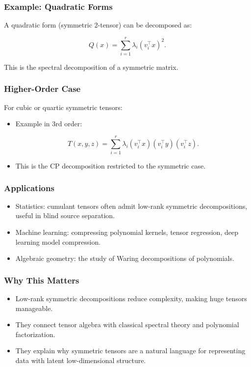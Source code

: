 \documentclass[
  letterpaper,
  DIV=11,
  numbers=noendperiod]{scrreprt}
\providecommand{\tightlist}{%
  \setlength{\itemsep}{0pt}\setlength{\parskip}{0pt}}
\begin{document}
\subsubsection{Example: Quadratic
Forms}\label{example-quadratic-forms-2}

A quadratic form (symmetric 2-tensor) can be decomposed as:

\[
Q(x) = \sum_{i=1}^r \lambda_i (v_i^\top x)^2.
\]

This is the spectral decomposition of a symmetric matrix.

\subsubsection{Higher-Order Case}\label{higher-order-case}

For cubic or quartic symmetric tensors:

\begin{itemize}
\item
  Example in 3rd order:

  \[
  T(x,y,z) = \sum_{i=1}^r \lambda_i (v_i^\top x)(v_i^\top y)(v_i^\top z).
  \]
\item
  This is the CP decomposition restricted to the symmetric case.
\end{itemize}

\subsubsection{Applications}\label{applications}

\begin{itemize}
\tightlist
\item
  Statistics: cumulant tensors often admit low-rank symmetric
  decompositions, useful in blind source separation.
\item
  Machine learning: compressing polynomial kernels, tensor regression,
  deep learning model compression.
\item
  Algebraic geometry: the study of Waring decompositions of polynomials.
\end{itemize}

\subsubsection{Why This Matters}\label{why-this-matters-26}

\begin{itemize}
\tightlist
\item
  Low-rank symmetric decompositions reduce complexity, making huge
  tensors manageable.
\item
  They connect tensor algebra with classical spectral theory and
  polynomial factorization.
\item
  They explain why symmetric tensors are a natural language for
  representing data with latent low-dimensional structure.
\end{itemize}
\end{document}
